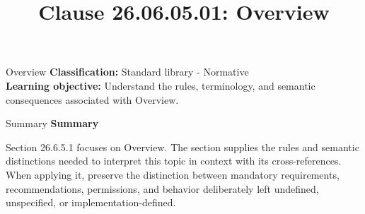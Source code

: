 \documentclass[10pt,letterpaper]{article}
\title{Clause 26.06.05.01: Overview}
\author{}
\date{}
\begin{document}
\maketitle
\begin{CornellOverviewBox}{Overview}
\textbf{Classification:} Standard library - Normative\\[2pt]
\textbf{Learning objective:} Understand the rules, terminology, and semantic consequences associated with Overview.
\end{CornellOverviewBox}\begin{CornellSummaryBox}{Summary}
{\sffamily\bfseries\color{Accent} Summary}\par\vspace{3pt}Section 26.6.5.1 focuses on Overview. The section supplies the rules and semantic distinctions needed to interpret this topic in context with its cross-references. When applying it, preserve the distinction between mandatory requirements, recommendations, permissions, and behavior deliberately left undefined, unspecified, or implementation-defined.
\end{CornellSummaryBox}
\end{document}
